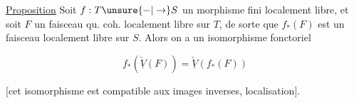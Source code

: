 
\uline{Proposition} Soit $f:T\unsure{-|\to}S$ un morphisme fini localement libre, et soit  $F$ un faisceau qu. coh. localement libre sur $T$, de sorte que $f_*(F)$ est un faisceau  localement libre sur $S$. Alors on a un isomorphisme fonctoriel

\[
\boxed{f_*(\underline{\check V}(F))=\underline{\check V}(f_*(F))}
\]

[cet isomorphisme est compatible aux images inverses,  localisation].

